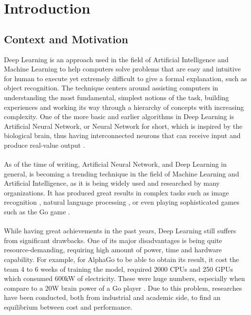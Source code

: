 \chapter{Introduction}

\section{Context and Motivation}

Deep Learning is an approach used in the field of Artificial Intelligence and Machine Learning to help computers solve problems that are easy and intuitive for human to execute yet extremely difficult to give a formal explanation, such as object recognition. The technique centers around assisting computers in understanding the most fundamental, simplest notions of the task, building experiences and working its way through a hierarchy of concepts with increasing complexity. One of the more basic and earlier algorithms in Deep Learning is Artificial Neural Network, or Neural Network for short, which is inspired by the biological brain, thus having interconnected neurons that can receive input and produce real-value output \cite{Goodfellow-et-al-2016}. \\
~\\
As of the time of writing, Artificial Neural Network, and Deep Learning in general, is becoming a trending technique in the field of Machine Learning and Artificial Intelligence, as it is being widely used and researched by many organizations. It has produced great results in complex tasks such as image recognition \cite{Krizhevsky:2012:ICD:2999134.2999257}, natural language processing \cite{recent-advances-in-deep-learning-for-speech-research-at-microsoft}, or even playing sophisticated games such as the Go game \cite{GoGame}. \\ 
~\\
While having great achievements in the past years, Deep Learning still suffers from significant drawbacks. One of its major disadvantages is being quite resource-demanding, requiring high amount of power, time and hardware capability. For example, for AlphaGo to be able to obtain its result, it cost the team 4 to 6 weeks of training the model, required 2000 CPUs and 250 GPUs which consumed 600kW of electricity. These were huge numbers, especially when compare to a 20W brain power of a Go player \cite{GoGame}. Due to this problem, researches have been conducted, both from industrial and academic side, to find an equilibrium between cost and performance. \\
